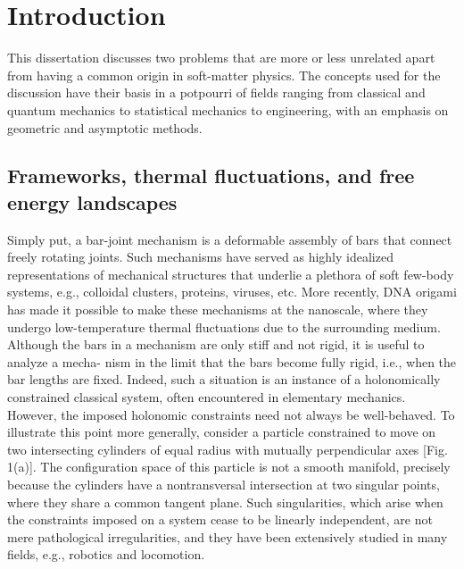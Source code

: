 
\chapter{Introduction}

This dissertation discusses two problems that are more or less unrelated apart from having a common origin in soft-matter physics.
The concepts used for the discussion have their basis in a potpourri of fields ranging from classical and quantum mechanics to statistical mechanics to engineering, with an emphasis on geometric and asymptotic methods.

\section{Frameworks, thermal fluctuations, and free energy landscapes}

Simply put, a bar-joint mechanism is a deformable assembly of bars that connect freely rotating joints. Such mechanisms have served as highly idealized representations of mechanical structures that underlie a plethora of soft few-body systems, e.g., colloidal clusters, proteins, viruses, etc. More recently, DNA origami has made it possible to make these mechanisms at the nanoscale, where they undergo low-temperature thermal fluctuations due to the surrounding medium. Although the bars in a mechanism are only stiff and not rigid, it is useful to analyze a mecha- nism in the limit that the bars become fully rigid, i.e., when the bar lengths are fixed. Indeed, such a situation is an instance of a holonomically constrained classical system, often encountered in elementary mechanics.
However, the imposed holonomic constraints need not always be well-behaved.
To illustrate this point more generally, consider a particle constrained to move on two intersecting cylinders of equal radius with mutually perpendicular axes [Fig. 1(a)].
The configuration space of this particle is not a smooth manifold, precisely because the cylinders have a nontransversal intersection at two singular points, where they share a common tangent plane.
Such singularities, which arise when the constraints imposed on a system cease to be linearly independent, are not mere pathological irregularities, and they have been extensively studied in many fields, e.g., robotics and locomotion.

